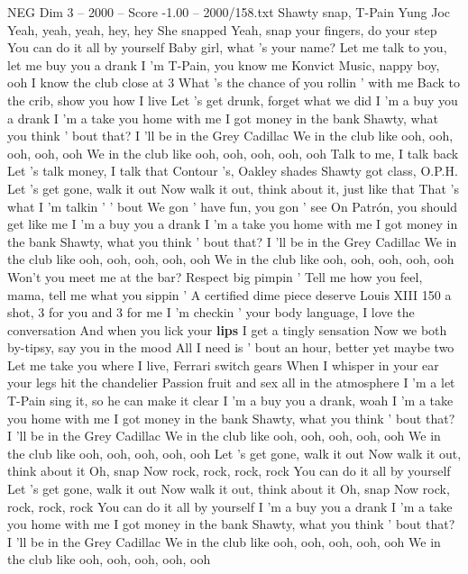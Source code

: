 \begin{textsample}{NEG Dim 3 – 2000 – Score -1.00 – 2000/158.txt}  \label{ex:f3_neg_013}
Shawty snap, T-Pain Yung Joc Yeah, yeah, yeah, hey, hey She snapped Yeah, snap your fingers, do your step You can do it all by yourself Baby girl, what 's your name?
Let me talk to you, let me buy you a drank I 'm T-Pain, you know me Konvict Music, nappy boy, ooh I know the club close at 3 What 's the chance of you rollin ' with me Back to the crib, show you how I live Let 's get drunk, forget what we did I 'm a buy you a drank I 'm a take you home with me I got money in the bank Shawty, what you think ' bout that?
I 'll be in the Grey Cadillac We in the club like ooh, ooh, ooh, ooh, ooh We in the club like ooh, ooh, ooh, ooh, ooh Talk to me, I talk back Let 's talk money, I talk that Contour 's, Oakley shades Shawty got class, O.P.H.
Let 's get gone, walk it out Now walk it out, think about it, just like that That 's what I 'm talkin ' ' bout We gon ' have fun, you gon ' see On Patrón, you should get like me I 'm a buy you a drank I 'm a take you home with me I got money in the bank Shawty, what you think ' bout that?
I 'll be in the Grey Cadillac We in the club like ooh, ooh, ooh, ooh, ooh We in the club like ooh, ooh, ooh, ooh, ooh Won't you meet me at the bar?
Respect big pimpin ' Tell me how you feel, mama, tell me what you sippin ' A certified dime piece deserve Louis XIII 150 a shot, 3 for you and 3 for me I 'm checkin ' your body language, I love the conversation And when you lick your \textbf{lips} I get a tingly sensation Now we both by-tipsy, say you in the mood All I need is ' bout an hour, better yet maybe two Let me take you where I live, Ferrari switch gears When I whisper in your ear your legs hit the chandelier Passion fruit and sex all in the atmosphere I 'm a let T-Pain sing it, so he can make it clear I 'm a buy you a drank, woah I 'm a take you home with me I got money in the bank Shawty, what you think ' bout that?
I 'll be in the Grey Cadillac We in the club like ooh, ooh, ooh, ooh, ooh We in the club like ooh, ooh, ooh, ooh, ooh Let 's get gone, walk it out Now walk it out, think about it Oh, snap Now rock, rock, rock, rock You can do it all by yourself Let 's get gone, walk it out Now walk it out, think about it Oh, snap Now rock, rock, rock, rock You can do it all by yourself I 'm a buy you a drank I 'm a take you home with me I got money in the bank Shawty, what you think ' bout that?
I 'll be in the Grey Cadillac We in the club like ooh, ooh, ooh, ooh, ooh We in the club like ooh, ooh, ooh, ooh, ooh

\end{textsample}
